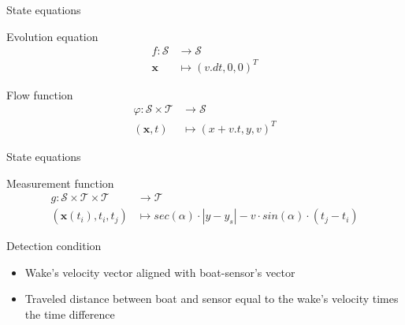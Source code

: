 \documentclass{beamer}
\begin{document}
            \begin{frame}{State equations}
                \begin{block}{Evolution equation}
                    \begin{equation}
                        \begin{aligned}
                            f\colon \mathcal{S} &\to \mathcal{S} \\
                            \mathbf{x} &\mapsto (v.dt, 0, 0)^T
                        \end{aligned}
                    \end{equation}
                \end{block}
                \begin{block}{Flow function}
                    \begin{equation}
                        \begin{aligned}
                            \varphi\colon \mathcal{S} \times \mathcal{T} &\to \mathcal{S} \\
                            (\mathbf{x}, t) &\mapsto (x + v.t, y, v)^T
                        \end{aligned}
                    \end{equation}
                \end{block}
            \end{frame}

            \begin{frame}{State equations}
                \begin{block}{Measurement function}
                    \begin{equation}
                        \begin{aligned}
                            g\colon \mathcal{S} \times \mathcal{T} \times \mathcal{T} &\to \mathcal{T} \\
                            (\mathbf{x}(t_i), t_i, t_j) &\mapsto sec(\alpha) \cdot |y - y_s| - v \cdot sin(\alpha) \cdot (t_j - t_i)
                        \end{aligned}
                    \end{equation}
                \end{block}
                \begin{block}{Detection condition}
                    \begin{itemize}
                        \item Wake's velocity vector aligned with boat-sensor's vector \\
                        \item Traveled distance between boat and sensor equal to the wake's velocity times the time difference
                    \end{itemize}
                \end{block}
            \end{frame}
\end{document}

